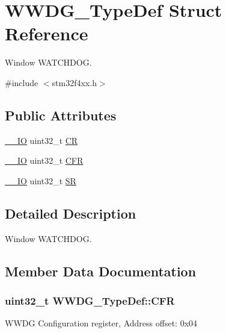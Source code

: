 \hypertarget{struct_w_w_d_g___type_def}{}\section{W\+W\+D\+G\+\_\+\+Type\+Def Struct Reference}
\label{struct_w_w_d_g___type_def}


Window W\+A\+T\+C\+H\+D\+OG.  




{\ttfamily \#include $<$stm32f4xx.\+h$>$}

\subsection*{Public Attributes}
\begin{DoxyCompactItemize}
\item 
\hyperlink{core__cm4_8h_aec43007d9998a0a0e01faede4133d6be}{\+\_\+\+\_\+\+IO} uint32\+\_\+t \hyperlink{struct_w_w_d_g___type_def_a4caf530d45f7428c9700d9c0057135f8}{CR}
\item 
\hyperlink{core__cm4_8h_aec43007d9998a0a0e01faede4133d6be}{\+\_\+\+\_\+\+IO} uint32\+\_\+t \hyperlink{struct_w_w_d_g___type_def_adcd6a7e5d75022e46ce60291f4b8544c}{C\+FR}
\item 
\hyperlink{core__cm4_8h_aec43007d9998a0a0e01faede4133d6be}{\+\_\+\+\_\+\+IO} uint32\+\_\+t \hyperlink{struct_w_w_d_g___type_def_a15655cda4854cc794db1f27b3c0bba38}{SR}
\end{DoxyCompactItemize}


\subsection{Detailed Description}
Window W\+A\+T\+C\+H\+D\+OG. 

\subsection{Member Data Documentation}
\subsubsection[{\texorpdfstring{C\+FR}{CFR}}]{ uint32\+\_\+t W\+W\+D\+G\+\_\+\+Type\+Def\+::\+C\+FR}\hypertarget{struct_w_w_d_g___type_def_adcd6a7e5d75022e46ce60291f4b8544c}{}\label{struct_w_w_d_g___type_def_adcd6a7e5d75022e46ce60291f4b8544c}
W\+W\+DG Configuration register, Address offset\+: 0x04 
